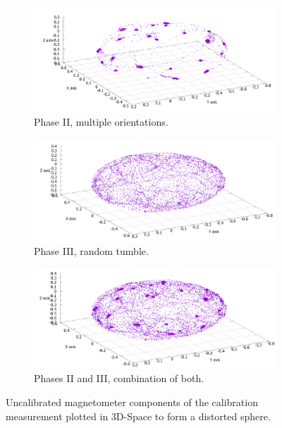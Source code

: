 \begin{figure}[h]
\begin{subfigure}[t]{.33\textwidth}
  \centering
  \includegraphics[width=.8\linewidth]{images/04_results/raw_sphere_calibration_phase_II.png}
  \caption{Phase II, multiple orientations.}
  \label{fig:res:raw_calibration_three_phase_II}
\end{subfigure}%
\begin{subfigure}[t]{.33\textwidth}
  \centering
  \includegraphics[width=.8\linewidth]{images/04_results/raw_sphere_calibration_phase_III.png}
  \caption{Phase III, random tumble.}
  \label{fig:res:raw_calibration_three_phase_III}
\end{subfigure}
\begin{subfigure}[t]{.33\textwidth}
  \centering
  \includegraphics[width=.8\linewidth]{images/04_results/raw_sphere_calibration_phases_II_III.png}
  \caption{Phases II and III, combination of both.}
\end{subfigure}
\caption{Uncalibrated magnetometer components of the calibration measurement plotted in 3D-Space to form a distorted sphere.}
\label{fig:res:raw_calibration_three_phases}
\end{figure}


